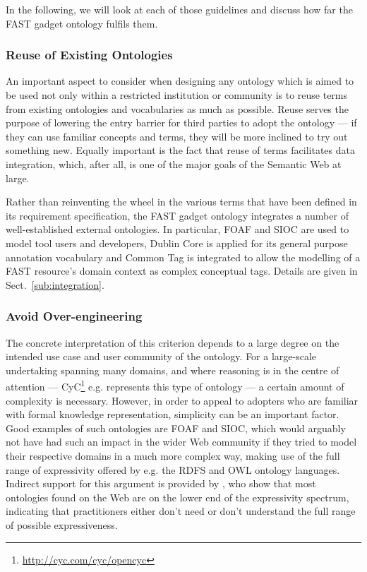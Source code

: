 \documentclass[twoside]{fast_latex}
\begin{document}
In the following, we will look at each of those guidelines and discuss how far the FAST gadget ontology fulfils them.

\subsubsection{Reuse of Existing Ontologies} %
\label{ssub:reuse_of_existing_ontologies}

An important aspect to consider when designing any ontology which is aimed to be used not only within a restricted institution or community is to reuse terms from existing ontologies and vocabularies as much as possible. Reuse serves the purpose of lowering the entry barrier for third parties to adopt the ontology --- if they can use familiar concepts and terms, they will be more inclined to try out something new. Equally important is the fact that reuse of terms facilitates data integration, which, after all, is one of the major goals of the Semantic Web at large.

Rather than reinventing the wheel in the various terms that have been defined in its requirement specification, the FAST gadget ontology integrates a number of well-established external ontologies. In particular, FOAF and SIOC are used to model tool users and developers, Dublin Core is applied for its general purpose annotation vocabulary and Common Tag is integrated to allow the modelling of a FAST resource's domain context as complex conceptual tags. Details are given in Sect.~\ref{sub:integration}.

\subsubsection{Avoid Over-engineering} %
\label{ssub:avoid_of_over_engineering}

The concrete interpretation of this criterion depends to a large degree on the intended use case and user community of the ontology. For a large-scale undertaking spanning many domains, and where reasoning is in the centre of attention --- CyC\footnote{\url{http://cyc.com/cyc/opencyc}} e.g. represents this type of ontology  --- a certain amount of complexity is necessary. However, in order to appeal to adopters who are familiar with formal knowledge representation, simplicity can be an important factor. Good examples of such ontologies are FOAF and SIOC, which would arguably not have had such an impact in the wider Web community if they tried to model their respective domains in a much more complex way, making use of the full range of expressivity offered by e.g. the RDFS and OWL ontology languages. Indirect support for this argument is provided by \cite{wang2006owl_survey}, who show that most ontologies found on the Web are on the lower end of the expressivity spectrum, indicating that practitioners either don't need or don't understand the full range of possible expressiveness.
\end{document}
